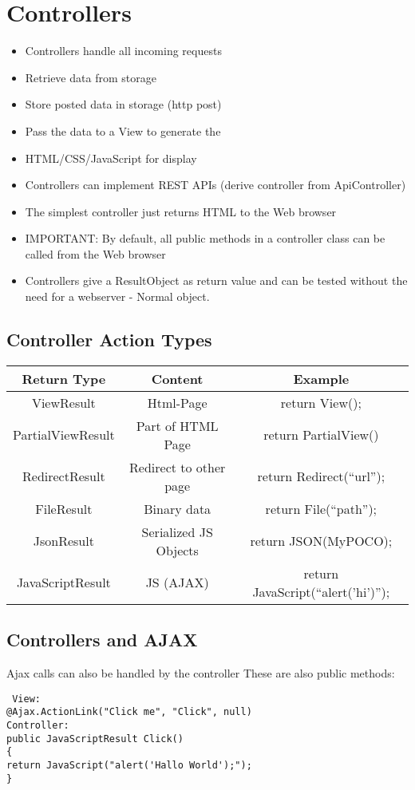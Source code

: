 \documentclass[a4paper,10pt]{scrreprt}
\begin{document}
\section{Controllers}
\begin{itemize}
\item Controllers handle all incoming requests
\item Retrieve data from storage
\item Store posted data in storage (http post)
\item Pass the data to a View to generate the
\item HTML/CSS/JavaScript for display
\item Controllers can implement REST APIs
(derive controller from ApiController)
\item  The simplest controller just returns HTML to
the Web browser
\item IMPORTANT: By default, all public methods
in a controller class can be called from the
Web browser
\item Controllers give a ResultObject as return value and can be tested without the need for a webserver - Normal 
object.

\end{itemize}

\subsection{Controller Action Types}
\begin{tabular}{c | c | c}
Return Type & Content & Example  \\ \hline
 ViewResult & Html-Page & return View(); \\ \hline
 PartialViewResult & Part of HTML Page  & return PartialView()  \\ \hline
 RedirectResult & Redirect to other page & return Redirect(``url''); \\ \hline
 FileResult & Binary data & return File(``path''); \\ \hline
 JsonResult & Serialized JS Objects & return JSON(MyPOCO); \\ \hline
 JavaScriptResult & JS (AJAX) & return JavaScript(``alert('hi')''); \\ \hline

\end{tabular}

\subsection{Controllers and AJAX}
Ajax calls can also be handled by the
controller
These are also public methods:
\begin{verbatim}
 View:
@Ajax.ActionLink("Click me", "Click", null)
Controller:
public JavaScriptResult Click()
{
return JavaScript("alert('Hallo World');");
} 	
\end{verbatim}
\end{document}
